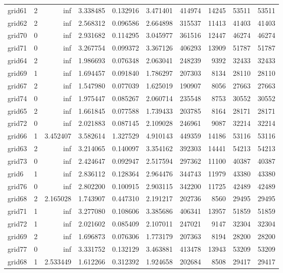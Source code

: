 \documentclass[../../../thesis.tex]{subfiles}
\begin{document}
\begin{longtable}{|l|r|r|r|r|r|r|r|r|r|}
grid61 & 2 & inf & 3.338485 & 0.132916 & 3.471401 & 414974 & 14245 & 53511 & 53511 \\
grid62 & 2 & inf & 2.568312 & 0.096586 & 2.664898 & 315537 & 11413 & 41403 & 41403 \\
grid70 & 0 & inf & 2.931682 & 0.114295 & 3.045977 & 361516 & 12447 & 46274 & 46274 \\
grid71 & 0 & inf & 3.267754 & 0.099372 & 3.367126 & 406293 & 13909 & 51787 & 51787 \\
grid64 & 2 & inf & 1.986693 & 0.076348 & 2.063041 & 248239 & 9392 & 32433 & 32433 \\
grid69 & 1 & inf & 1.694457 & 0.091840 & 1.786297 & 207303 & 8134 & 28110 & 28110 \\
grid67 & 2 & inf & 1.547980 & 0.077039 & 1.625019 & 190907 & 8056 & 27663 & 27663 \\
grid74 & 0 & inf & 1.975447 & 0.085267 & 2.060714 & 235548 & 8753 & 30552 & 30552 \\
grid65 & 2 & inf & 1.661845 & 0.077588 & 1.739433 & 203785 & 8164 & 28171 & 28171 \\
grid72 & 0 & inf & 2.021883 & 0.087145 & 2.109028 & 246961 & 9087 & 32214 & 32214 \\
grid66 & 1 & 3.452407 & 3.582614 & 1.327529 & 4.910143 & 449359 & 14186 & 53116 & 53116 \\
grid63 & 2 & inf & 3.214065 & 0.140097 & 3.354162 & 392303 & 14441 & 54213 & 54213 \\
grid73 & 0 & inf & 2.424647 & 0.092947 & 2.517594 & 297362 & 11100 & 40387 & 40387 \\
grid6 & 1 & inf & 2.836112 & 0.128364 & 2.964476 & 344743 & 11979 & 43380 & 43380 \\
grid76 & 0 & inf & 2.802200 & 0.100915 & 2.903115 & 342200 & 11725 & 42489 & 42489 \\
grid68 & 2 & 2.165028 & 1.743907 & 0.447310 & 2.191217 & 202736 & 8560 & 29495 & 29495 \\
grid71 & 1 & inf & 3.277080 & 0.108606 & 3.385686 & 406341 & 13957 & 51859 & 51859 \\
grid72 & 1 & inf & 2.021602 & 0.085409 & 2.107011 & 247021 & 9147 & 32304 & 32304 \\
grid69 & 2 & inf & 1.696873 & 0.076306 & 1.773179 & 207363 & 8194 & 28200 & 28200 \\
grid77 & 0 & inf & 3.331752 & 0.132129 & 3.463881 & 413478 & 13943 & 53209 & 53209 \\
grid68 & 1 & 2.533449 & 1.612266 & 0.312392 & 1.924658 & 202684 & 8508 & 29417 & 29417 \\

\end{longtable}
\end{document}
